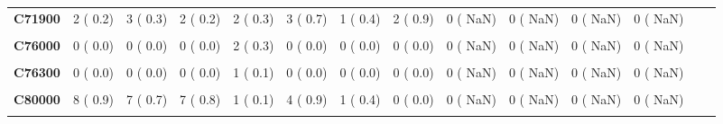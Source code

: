 \documentclass[
]{article}
\begin{document}
\begin{table}[H]
\begin{tabular}[t]{>{\raggedright\arraybackslash}p{5em}ccccccccccccc}
\textbf{C71900} & 2 (  0.2) & 3 (  0.3) & 2 (  0.2) & 2 (  0.3) & 3 (  0.7) & 1 (  0.4) & 2 (  0.9) & 0 (  NaN) & 0 (  NaN) & 0 (  NaN) & 0 (  NaN) &  & \\
\textbf{\cellcolor{gray!10}{C73000}} & \cellcolor{gray!10}{1 (  0.1)} & \cellcolor{gray!10}{1 (  0.1)} & \cellcolor{gray!10}{1 (  0.1)} & \cellcolor{gray!10}{0 (  0.0)} & \cellcolor{gray!10}{0 (  0.0)} & \cellcolor{gray!10}{0 (  0.0)} & \cellcolor{gray!10}{1 (  0.4)} & \cellcolor{gray!10}{0 (  NaN)} & \cellcolor{gray!10}{0 (  NaN)} & \cellcolor{gray!10}{0 (  NaN)} & \cellcolor{gray!10}{0 (  NaN)} & \cellcolor{gray!10}{} & \cellcolor{gray!10}{}\\
\textbf{C76000} & 0 (  0.0) & 0 (  0.0) & 0 (  0.0) & 2 (  0.3) & 0 (  0.0) & 0 (  0.0) & 0 (  0.0) & 0 (  NaN) & 0 (  NaN) & 0 (  NaN) & 0 (  NaN) &  & \\
\textbf{\cellcolor{gray!10}{C76200}} & \cellcolor{gray!10}{0 (  0.0)} & \cellcolor{gray!10}{0 (  0.0)} & \cellcolor{gray!10}{1 (  0.1)} & \cellcolor{gray!10}{0 (  0.0)} & \cellcolor{gray!10}{0 (  0.0)} & \cellcolor{gray!10}{0 (  0.0)} & \cellcolor{gray!10}{0 (  0.0)} & \cellcolor{gray!10}{0 (  NaN)} & \cellcolor{gray!10}{0 (  NaN)} & \cellcolor{gray!10}{0 (  NaN)} & \cellcolor{gray!10}{0 (  NaN)} & \cellcolor{gray!10}{} & \cellcolor{gray!10}{}\\
\textbf{C76300} & 0 (  0.0) & 0 (  0.0) & 0 (  0.0) & 1 (  0.1) & 0 (  0.0) & 0 (  0.0) & 0 (  0.0) & 0 (  NaN) & 0 (  NaN) & 0 (  NaN) & 0 (  NaN) &  & \\
\textbf{\cellcolor{gray!10}{C78700}} & \cellcolor{gray!10}{1 (  0.1)} & \cellcolor{gray!10}{0 (  0.0)} & \cellcolor{gray!10}{0 (  0.0)} & \cellcolor{gray!10}{1 (  0.1)} & \cellcolor{gray!10}{0 (  0.0)} & \cellcolor{gray!10}{0 (  0.0)} & \cellcolor{gray!10}{0 (  0.0)} & \cellcolor{gray!10}{0 (  NaN)} & \cellcolor{gray!10}{0 (  NaN)} & \cellcolor{gray!10}{0 (  NaN)} & \cellcolor{gray!10}{0 (  NaN)} & \cellcolor{gray!10}{} & \cellcolor{gray!10}{}\\
\textbf{C80000} & 8 (  0.9) & 7 (  0.7) & 7 (  0.8) & 1 (  0.1) & 4 (  0.9) & 1 (  0.4) & 0 (  0.0) & 0 (  NaN) & 0 (  NaN) & 0 (  NaN) & 0 (  NaN) &  & \\
\textbf{\cellcolor{gray!10}{C81900}} & \cellcolor{gray!10}{0 (  0.0)} & \cellcolor{gray!10}{0 (  0.0)} & \cellcolor{gray!10}{0 (  0.0)} & \cellcolor{gray!10}{1 (  0.1)} & \cellcolor{gray!10}{0 (  0.0)} & \cellcolor{gray!10}{0 (  0.0)} & \cellcolor{gray!10}{0 (  0.0)} & \cellcolor{gray!10}{0 (  NaN)} & \cellcolor{gray!10}{0 (  NaN)} & \cellcolor{gray!10}{0 (  NaN)} & \cellcolor{gray!10}{0 (  NaN)} & \cellcolor{gray!10}{} & \cellcolor{gray!10}{}\\

\end{tabular}
\end{table}
\end{document}

